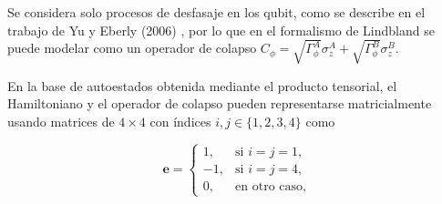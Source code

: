 Se considera solo procesos de desfasaje en los qubit, como se describe en el trabajo de Yu y Eberly (2006) \cite{ESD}, por lo que en el formalismo de Lindbland se puede modelar como un operador de colapso \(C_\phi = \sqrt{\Gamma_\phi^{A}} \sigma_z^{A} + \sqrt{\Gamma_\phi^{B}} \sigma_z^{B}\). 







En la base de autoestados obtenida mediante el producto tensorial, el Hamiltoniano y el operador de colapso pueden representarse matricialmente usando matrices de \(4 \times 4\) con índices \(i, j \in \{1, 2, 3, 4\}\) como

\begin{equation} \nonumber
    \mathbf{e} =
    \begin{cases}
        1, & \text{si } i = j = 1, \\
        -1, & \text{si } i = j = 4, \\
        0, & \text{en otro caso,}
    \end{cases}
\end{equation}

